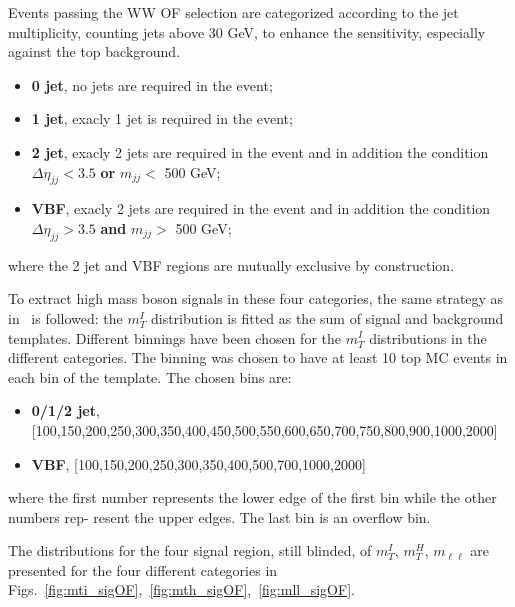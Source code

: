 Events passing the WW OF selection are categorized according to the jet
multiplicity, counting jets above 30 GeV, to enhance the sensitivity,
especially against the top background. 

\begin{itemize}
\item {\bf 0 jet}, no jets are required in the event;
\item {\bf 1 jet}, exacly 1 jet is required in the event;
\item {\bf 2 jet}, exacly 2 jets are required in the event and in addition the condition $\Delta \eta_{jj} < 3.5$ {\bf or} $m_{jj} <$ 500 GeV;
\item {\bf VBF}, exacly 2 jets are required in the event and in addition the condition $\Delta \eta_{jj} > 3.5$ {\bf and} $m_{jj} >$ 500 GeV;
\end{itemize}

where the 2 jet and VBF regions are mutually exclusive by construction.

To extract high mass boson signals in these four categories, the same strategy
as in~\cite{CMS-PAS-HIG-16-023} is followed: the $m_T^I$ distribution is fitted as the sum of
signal and background templates.
Different binnings have been chosen for the  $m_T^I$ distributions in the
different categories. The binning was chosen to have  at least 10
top MC events in each bin of the template. The chosen bins are: 

\begin{itemize}
\item  {\bf 0/1/2 jet}, [100,150,200,250,300,350,400,450,500,550,600,650,700,750,800,900,1000,2000]
\item {\bf VBF}, [100,150,200,250,300,350,400,500,700,1000,2000]
\end{itemize}
where the first number represents the lower edge of the first bin while the other numbers rep-
resent the upper edges. The last bin is an overflow bin.

The distributions for the four signal region, still blinded, of $m_T^I$,
$m_T^H$, $m_{\ell \ell}$ are presented for the four different
categories in
Figs.~\ref{fig:mti_sigOF},~\ref{fig:mth_sigOF},~\ref{fig:mll_sigOF}.


